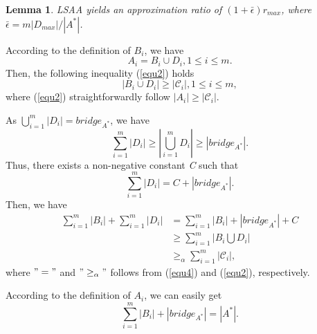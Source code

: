 \documentclass[journal]{IEEEtran}
\newtheorem{lemma}{Lemma}
\begin{document}
\begin{lemma}\label{lemma1}
 LSAA yields an approximation ratio of $(1+\bar{\epsilon})r_{max}$, where $\bar{\epsilon} =m|D_{max}|/|A^*|$.
\end{lemma}

\begin{IEEEproof}
According to the definition of $B_i$, we have
\begin{equation}\label{equ1}
    A_i=B_i\cup D_i, 1\leq i\leq m.
\end{equation}
Then, the following inequality (\ref{equ2}) holds
\begin{equation}\label{equ2}
    |B_i\cup D_i|\geq |\mathcal{C}_i|, 1\leq i\leq m,
\end{equation}
where (\ref{equ2}) straightforwardly follow $|A_i|\geq|\mathcal{C}_i|$.

As $\bigcup\limits_{i=1}^m|D_i|=bridge_{A^*}$, we have
\begin{equation}\label{equ3}
    \sum\limits_{i=1}^m|D_i|\geq \left|\bigcup\limits_{i=1}^mD_i\right|\geq|bridge_{A^*}|.
\end{equation}
Thus, there exists a non-negative constant \emph{C} such that
\begin{equation}\label{equ4}
    \sum\limits_{i=1}^m|D_i|=C+|bridge_{A^*}|.
\end{equation}
Then, we have
\begin{equation}\label{equ5}
 \begin{split}
  \sum\limits_{i=1}^m|B_i|+\sum\limits_{i=1}^m|D_i|&= \sum\limits_{i=1}^m|B_i|+|bridge_{A^*}|+C\\
        & \geq\sum\limits_{i=1}^m\left|B_i\bigcup D_i\right|\\
        &\geq_\alpha\sum\limits_{i=1}^m|\mathcal{C}_i|,
\end{split}
\end{equation}
where $"="$ and $"\geq_\alpha"$ follows from (\ref{equ4}) and (\ref{equ2}), respectively.

According to the definition of $A_i$, we can easily get
\begin{equation}\label{equ6}
    \sum\limits_{i=1}^m|B_i|+|bridge_{A^*}|=|A^*|.
\end{equation}


\end{IEEEproof}
\end{document}
